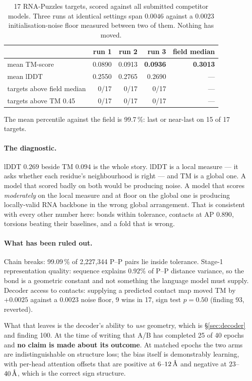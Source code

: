 \documentclass[11pt,a4paper]{article}
\begin{document}
\begin{table}[H]\centering\small
\begin{tabular}{lrrrr}
\toprule
& run 1 & run 2 & run 3 & field median \\
\midrule
mean TM-score & 0.0890 & 0.0913 & \textbf{0.0936} & \textbf{0.3013} \\
mean lDDT     & 0.2550 & 0.2765 & 0.2690 & --- \\
targets above field median & 0/17 & 0/17 & 0/17 & --- \\
targets above TM 0.45 & 0/17 & 0/17 & 0/17 & --- \\
\bottomrule
\end{tabular}
\caption{17 RNA-Puzzles targets, scored against all submitted competitor
models. Three runs at identical settings span $0.0046$ against a
$0.0023$ initialisation-noise floor measured between two of them.
Nothing has moved.}
\end{table}

The mean percentile against the field is 99.7\,\%: last or near-last on
15 of 17 targets.

\paragraph{The diagnostic.} lDDT $0.269$ beside TM $0.094$ is the whole
story. lDDT is a local measure --- it asks whether each residue's
neighbourhood is right --- and TM is a global one. A model that scored
badly on both would be producing noise. A model that scores
\emph{moderately} on the local measure and at floor on the global one is
producing locally-valid RNA backbone in the wrong global arrangement.
That is consistent with every other number here: bonds within tolerance,
contacts at AP $0.890$, torsions beating their baselines, and a fold that
is wrong.

\paragraph{What has been ruled out.} Chain breaks: 99.09\,\% of
2{,}227{,}344 P--P pairs lie inside tolerance. Stage-1 representation
quality: sequence explains $0.92\%$ of P--P distance variance, so the
bond is a geometric constant and not something the language model must
supply. Decoder access to contacts: supplying a predicted contact map
moved TM by $+0.0025$ against a $0.0023$ noise floor, 9 wins in 17, sign
test $p = 0.50$ (finding 93, reverted).

What that leaves is the decoder's ability to \emph{use} geometry, which
is \S\ref{sec:decoder} and finding 100. At the time of writing that A/B
has completed 25 of 40 epochs and \textbf{no claim is made about its
outcome}. At matched epochs the two arms are indistinguishable on
structure loss; the bias itself is demonstrably learning, with per-head
attention offsets that are positive at $6$--$12\,\text{\AA}$ and negative at
$23$--$40\,\text{\AA}$, which is the correct sign structure.
\end{document}
